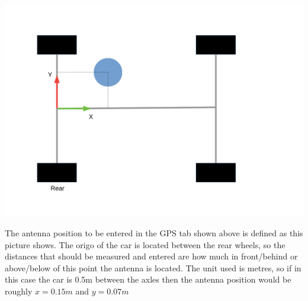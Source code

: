 \documentclass[12pt]{article} %
\def\printtodos{0}
\newcommand{\todo}[1]{
  \if\printtodos1
      {\color{red} \textbf{TODO:} #1}
  \fi}
\begin{document}
\noindent\begin{minipage}{0.4\textwidth}
  \noindent \includegraphics[width=\textwidth]{./pictures/gps_antenna_offset.pdf}
\end{minipage}
\begin{minipage}{0.6\textwidth} %
  The antenna position to be entered in the GPS tab shown above is
  defined as this picture shows. The origo of the car is located
  between the rear wheels, so the distances that should be measured
  and entered are how much in front/behind or above/below of this
  point the antenna is located. The unit used is metres, so if in this
  case the car is 0.5m between the axles then the antenna position
  would be roughly $x=0.15m$ and $y=0.07m$
\end{minipage}




\end{document}
